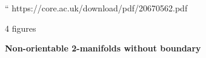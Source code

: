\documentclass[]{article}
\begin{document}
\begin{thebibliography}{9}
         {\sc }
         `` https://core.ac.uk/download/pdf/20670562.pdf
\end{thebibliography}

\caption{ 4 figures}

\textbf{Non-orientable 2-manifolds without boundary}\\
\end{document}
